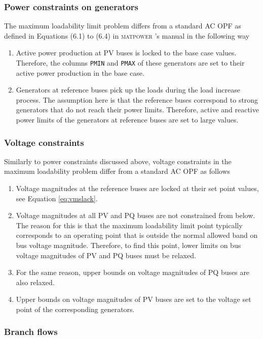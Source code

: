 \documentclass[12pt,a4]{article}
\newcommand*{\codemat}[1]{\texttt{#1}}
\newcommand*{\matpower}{\textsc{matpower} }
\begin{document}
\subsubsection{Power constraints on generators}
\label{sec:constr-gen}


The maximum loadability limit problem differs from a standard AC OPF as defined in Equations (6.1) to (6.4) in \matpower's manual in the following way
\begin{enumerate}
\item Active power production at PV buses is locked to the base case values. Therefore, the columns \codemat{PMIN} and \codemat{PMAX} of these generators are set to their active power production in the base case.
\item Generators at reference buses pick up the loads during the load increase process. The assumption here is that the reference buses correspond to strong generators that do not reach their power limits. Therefore, active and reactive power limits of the generators at reference buses are set to large values.
\end{enumerate}

\subsubsection{Voltage constraints}
\label{sec:volt-constr-at}
Similarly to power constraints discussed above, voltage constraints in the maximum loadability problem differ from a standard AC OPF as follows
\begin{enumerate}
\item Voltage magnitudes at the reference buses are locked at their set point values, see Equation \eqref{eq:vmslack}.
\item Voltage magnitudes at all PV and PQ buses are not constrained from below. The reason for this is that the maximum loadability limit point typically corresponds to an operating point that is outside the normal allowed band on bus voltage magnitude. Therefore, to find this point, lower limits on bus voltage magnitudes of PV and PQ buses must be relaxed.
\item For the same reason, upper bounds on voltage magnitudes of PQ buses are also relaxed.
\item Upper bounds on voltage magnitudes of PV buses are set to the voltage set point of the corresponding generators.
\end{enumerate}

\subsubsection{Branch flows}
\label{sec:branch-flows}
\end{document}

